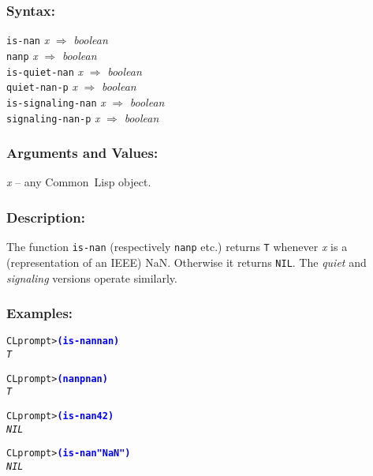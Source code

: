 \documentclass[10pt,fleqn]{article}
\newcommand{\CL}{\textsf{Common~Lisp}}
\newcommand{\code}[1]{\texttt{#1}}
\newcommand{\varname}[1]{\textit{#1}}
\newcommand{\codeprompt}[1]{\textcolor{blue}{\textbf{#1}}}
\newcommand{\DSyntax}{\subsubsection*{Syntax:}}
\newcommand{\DArgsNValues}{\subsubsection*{Arguments and Values:}}
\newcommand{\DDescription}{\subsubsection*{Description:}}
\newcommand{\DExamples}{\subsubsection*{Examples:}}
\begin{document}
\DSyntax{}

\code{is-nan} \varname{x} $\Rightarrow$ \textit{boolean}\\
\code{nanp} \varname{x} $\Rightarrow$ \textit{boolean}\\
\code{is-quiet-nan} \varname{x} $\Rightarrow$ \textit{boolean}\\
\code{quiet-nan-p} \varname{x} $\Rightarrow$ \textit{boolean}\\
\code{is-signaling-nan} \varname{x} $\Rightarrow$ \textit{boolean}\\
\code{signaling-nan-p} \varname{x} $\Rightarrow$ \textit{boolean}\\

\DArgsNValues{}

\varname{x} -- any \CL{} object.

\DDescription{}

The function \code{is-nan} (respectively \code{nanp} etc.) returns \code{T}
whenever \varname{x} is a (representation of an IEEE) NaN.  Otherwise
it returns \code{NIL}. The \emph{quiet} and \emph{signaling} versions
operate similarly.

\DExamples{}

\begin{alltt}
CL prompt> \codeprompt{(is-nan nan)}
\textit{T}

CL prompt> \codeprompt{(nanp nan)}
\textit{T}

CL prompt> \codeprompt{(is-nan 42)}
\textit{NIL}

CL prompt> \codeprompt{(is-nan "NaN")}
\textit{NIL}
\end{alltt}
\end{document}

